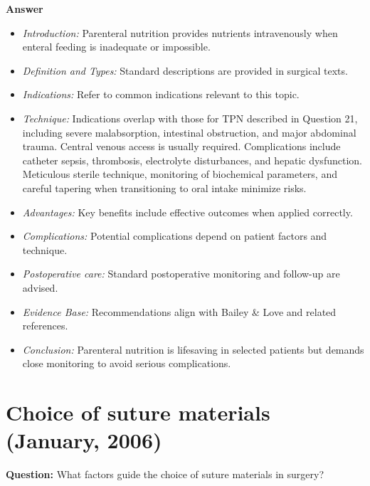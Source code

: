 \documentclass{article}
\begin{document}
\textbf{Answer}
\begin{itemize}

\item \emph{Introduction:} Parenteral nutrition provides nutrients intravenously when enteral feeding is inadequate or impossible.
\item \emph{Definition and Types:} Standard descriptions are provided in surgical texts.
\item \emph{Indications:} Refer to common indications relevant to this topic.

\item \emph{Technique:} Indications overlap with those for TPN described in Question 21, including severe malabsorption, intestinal obstruction, and major abdominal trauma. Central venous access is usually required. Complications include catheter sepsis, thrombosis, electrolyte disturbances, and hepatic dysfunction. Meticulous sterile technique, monitoring of biochemical parameters, and careful tapering when transitioning to oral intake minimize risks.
\item \emph{Advantages:} Key benefits include effective outcomes when applied correctly.
\item \emph{Complications:} Potential complications depend on patient factors and technique.
\item \emph{Postoperative care:} Standard postoperative monitoring and follow-up are advised.
\item \emph{Evidence Base:} Recommendations align with Bailey \& Love and related references.

\item \emph{Conclusion:} Parenteral nutrition is lifesaving in selected patients but demands close monitoring to avoid serious complications.


\end{itemize}

\section{Choice of suture materials (January, 2006)}

\textbf{Question:} What factors guide the choice of suture materials in surgery?
\end{document}
